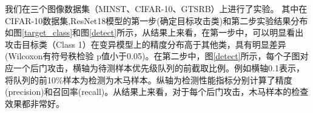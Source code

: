 \documentclass[fontset=macnew,UTF8]{article} %
\begin{document}
我们在三个图像数据集（MINST、CIFAR-10、GTSRB）上进行了实验。
其中在CIFAR-10数据集,ResNet18模型的第一步(确定目标攻击类)和第二步实验结果分布如图\ref{target_class}和图\ref{detect}所示，从结果上来看，在第一步中，可以明显看出攻击目标类（Class 1）在变异模型上的精度分布高于其他类，具有明显差异(Wilcoxon有符号秩检验 p值小于0.05)。在第二步中，图\ref{detect}所示，每个子图对应一个后门攻击，横轴为待测样本优先级队列的前截取比例。例如横轴0.1表示，将队列的前10\%样本为检测为木马样本。纵轴为检测性能指标分别计算了精度(precision)和召回率(recall)。从结果上来看，对于每个后门攻击，木马样本的检查效果都非常好。


\begin{figure}[t]
\end{figure}
\end{document}

